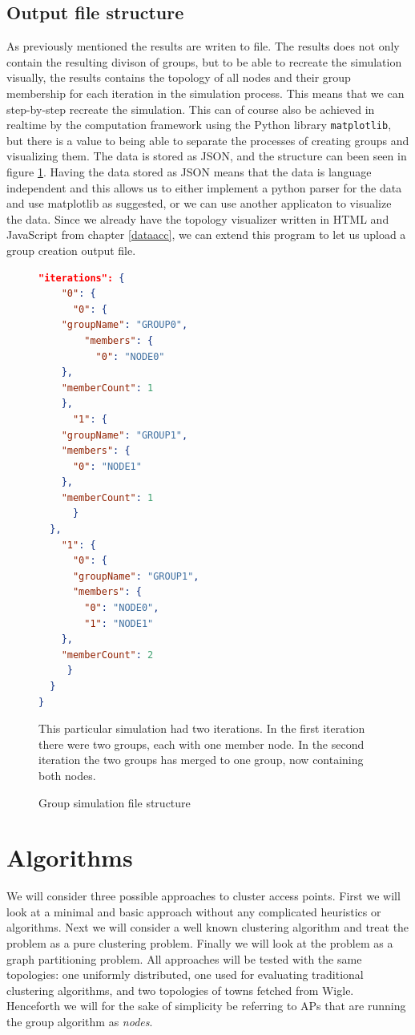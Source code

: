\subsection{Output file structure}
As previously mentioned the results are writen to file. The results does not only contain the resulting divison of groups, but to be able to recreate the simulation
visually, the results contains the topology of all nodes and their group membership for each iteration in the simulation process. This means that we can step-by-step
recreate the simulation. This can of course also be achieved in realtime by the computation framework using the Python library \verb|matplotlib|, but
there is a value to being able to separate the processes of creating groups and visualizing them. The data is stored as JSON, and the structure can been seen in
figure \ref{fig:jsongroup}. Having the data stored as JSON means that the data is language independent and this allows us to either implement a
python parser for the data and use matplotlib as suggested, or we can use another applicaton to visualize the data. Since we already have the topology visualizer
written in HTML and JavaScript from chapter \ref{dataacc}, we can extend this program to let us upload a group creation output file. 
\begin{figure}[H]
\begin{minipage}{\linewidth}
\begin{lstlisting}[language=json]
  "iterations": {
    "0": {
      "0": {
	"groupName": "GROUP0",
        "members": {
          "0": "NODE0"
	},
	"memberCount": 1
    },
      "1": {
	"groupName": "GROUP1",
	"members": {
	  "0": "NODE1"
	},
	"memberCount": 1
      }
  },
    "1": {
      "0": {
	  "groupName": "GROUP1",
	  "members": {
	    "0": "NODE0",
	    "1": "NODE1"
	},
	"memberCount": 2
     }
  }
}
\end{lstlisting}
\end{minipage}

\caption{Group simulation file structure}
\medskip
\small
This particular simulation had two iterations. In the first iteration there were two groups, each with one member node. In the second iteration the two groups has merged to one group, now
containing both nodes. 
\label{fig:jsongroup}
\end{figure}



\section{Algorithms}\label{algorithm}
We will consider three possible approaches to cluster access points. First we will look at a minimal and basic approach without any complicated heuristics or algorithms. 
Next we will consider a well known clustering algorithm and treat the problem as a pure clustering problem. Finally we will look at the problem as a graph partitioning problem.
All approaches will be tested with the same topologies: one uniformly distributed, one used for evaluating traditional clustering algorithms, and two topologies 
of towns fetched from Wigle. Henceforth we will for the sake of simplicity be referring to APs that are running the group algorithm as \textit{nodes}.

